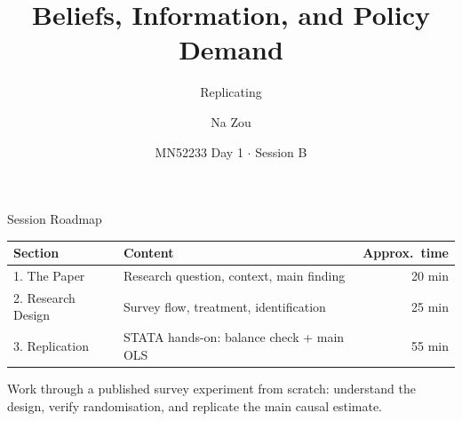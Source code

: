 \documentclass[aspectratio=169, 11pt]{beamer}
\title[D1B: Lab --- Settele (2022)]{Beliefs, Information, and Policy Demand}
\subtitle{Replicating \citet{Settele2022_gender}}
\author{Na Zou}
\institute{University of Bath \\ School of Management}
\date{MN52233 \quad Day 1 $\cdot$ Session B}
\begin{document}

\begin{frame}
  \titlepage
\end{frame}


\begin{frame}[t]{Session Roadmap}
\vspace{0.4em}
\begin{center}
\footnotesize
\begin{tabular}{llr}
\toprule
\textbf{Section} & \textbf{Content} & \textbf{Approx.\ time} \\
\midrule
1. The Paper        & Research question, context, main finding     & 20 min \\
2. Research Design  & Survey flow, treatment, identification        & 25 min \\
3. Replication      & STATA hands-on: balance check + main OLS     & 55 min \\
\bottomrule
\end{tabular}
\end{center}
\vspace{0.5em}
\begin{keybox}
Work through a published survey experiment from scratch:
understand the design, verify randomisation, and replicate the main causal estimate.
\end{keybox}
\vspace{0.4em}
\end{frame}

\end{document}
